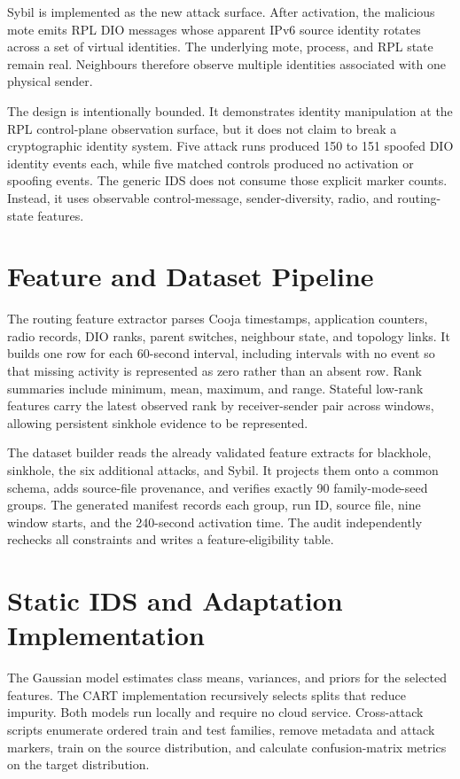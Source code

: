 Sybil is implemented as the new attack surface. After activation, the malicious mote emits RPL DIO messages whose apparent IPv6 source identity rotates across a set of virtual identities. The underlying mote, process, and RPL state remain real. Neighbours therefore observe multiple identities associated with one physical sender.

The design is intentionally bounded. It demonstrates identity manipulation at the RPL control-plane observation surface, but it does not claim to break a cryptographic identity system. Five attack runs produced 150 to 151 spoofed DIO identity events each, while five matched controls produced no activation or spoofing events. The generic IDS does not consume those explicit marker counts. Instead, it uses observable control-message, sender-diversity, radio, and routing-state features.

\section{Feature and Dataset Pipeline}

The routing feature extractor parses Cooja timestamps, application counters, radio records, DIO ranks, parent switches, neighbour state, and topology links. It builds one row for each 60-second interval, including intervals with no event so that missing activity is represented as zero rather than an absent row. Rank summaries include minimum, mean, maximum, and range. Stateful low-rank features carry the latest observed rank by receiver-sender pair across windows, allowing persistent sinkhole evidence to be represented.

The dataset builder reads the already validated feature extracts for blackhole, sinkhole, the six additional attacks, and Sybil. It projects them onto a common schema, adds source-file provenance, and verifies exactly 90 family-mode-seed groups. The generated manifest records each group, run ID, source file, nine window starts, and the 240-second activation time. The audit independently rechecks all constraints and writes a feature-eligibility table.

\section{Static IDS and Adaptation Implementation}

The Gaussian model estimates class means, variances, and priors for the selected features. The CART implementation recursively selects splits that reduce impurity. Both models run locally and require no cloud service. Cross-attack scripts enumerate ordered train and test families, remove metadata and attack markers, train on the source distribution, and calculate confusion-matrix metrics on the target distribution.

